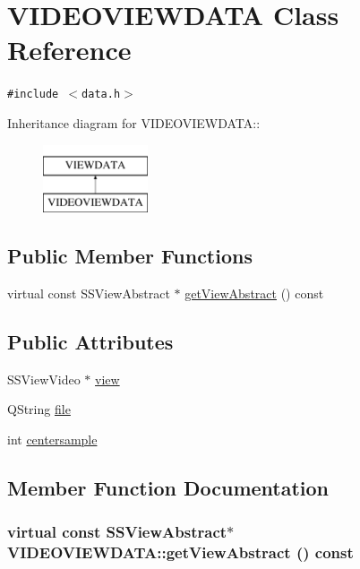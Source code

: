 \hypertarget{class_v_i_d_e_o_v_i_e_w_d_a_t_a}{
\section{VIDEOVIEWDATA Class Reference}
\label{class_v_i_d_e_o_v_i_e_w_d_a_t_a}
}
{\tt \#include $<$data.h$>$}

Inheritance diagram for VIDEOVIEWDATA::\begin{figure}[H]
\begin{center}
\leavevmode
\includegraphics[height=2cm]{class_v_i_d_e_o_v_i_e_w_d_a_t_a}
\end{center}
\end{figure}
\subsection*{Public Member Functions}
\begin{CompactItemize}
\item 
virtual const SSViewAbstract $\ast$ \hyperlink{class_v_i_d_e_o_v_i_e_w_d_a_t_a_ce8442db2dd761b868584957cc49bfd2}{getViewAbstract} () const 
\end{CompactItemize}
\subsection*{Public Attributes}
\begin{CompactItemize}
\item 
SSViewVideo $\ast$ \hyperlink{class_v_i_d_e_o_v_i_e_w_d_a_t_a_8f32fc797bb50ce6f93d95de6b8f577d}{view}
\item 
QString \hyperlink{class_v_i_d_e_o_v_i_e_w_d_a_t_a_967fb1b0dc2bd0e7fcd21dda9cf582c3}{file}
\item 
int \hyperlink{class_v_i_d_e_o_v_i_e_w_d_a_t_a_bc465d11766026ffab33277647f3c662}{centersample}
\end{CompactItemize}


\subsection{Member Function Documentation}
\hypertarget{class_v_i_d_e_o_v_i_e_w_d_a_t_a_ce8442db2dd761b868584957cc49bfd2}{
\subsubsection[{getViewAbstract}]{\setlength{\rightskip}{0pt plus 5cm}virtual const SSViewAbstract$\ast$ VIDEOVIEWDATA::getViewAbstract () const}}
\label{class_v_i_d_e_o_v_i_e_w_d_a_t_a_ce8442db2dd761b868584957cc49bfd2}




